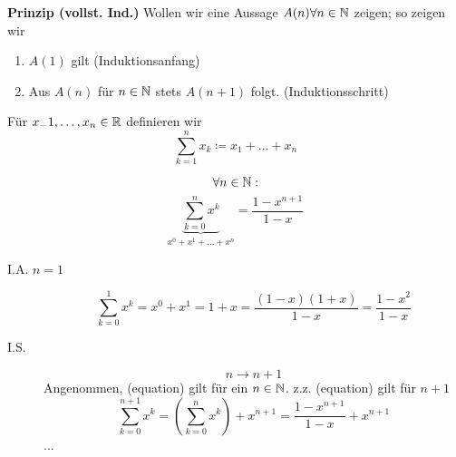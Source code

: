 \documentclass[consecutivenumbering]{gadsescript}
\begin{document}
\textbf{Prinzip (vollst. Ind.)} Wollen wir eine Aussage $ A(n) \forall n \in \mathbb{N} $ zeigen; so zeigen wir
\begin{enumerate}[label=(\roman*)]
	\item $ A(1) $ gilt (Induktionsanfang)
	\item Aus $ A(n) $ für $ n \in \mathbb{N} $ stets $ A(n+1) $ folgt. (Induktionsschritt)
\end{enumerate}

\begin{definition}[Summen]
	Für $x_-1, \dotsc, x_n \in \mathbb{R} $ definieren wir
	\[ \sum_{k = 1}^{n} x_k \coloneqq x_1 + \dotsc + x_n \]
\end{definition}

\begin{example}
	\[ \forall n \in \mathbb{N} : \]
	\begin{equation}
		\underbrace{\sum_{k=0}^{n} x^k}_{x^0 + x^1 + ... + x^n} =  \frac{1-x^{n+1}}{1-x}
	\end{equation}
	
	\begin{description}
		\item[I.A. $n = 1$]
			\[ \sum_{k=0}^{1}x^k = x^0 + x^1 = 1+x = \frac{(1-x)(1+x)}{1-x} = \frac{1-x^2}{1-x} \]
		\item[I.S.]
			\[ n \to n+1 \] Angenommen, (equation) gilt für ein $n \in \mathbb{N} $.
			z.z. (equation) gilt für $ n + 1 $
			\[ \sum_{k=0}^{n+1}x^k = \left( \sum_{k=0}^{n}x^k\right) + x^{n+1} =  \frac{1 - x^{n + 1}}{1 - x} + x^{n + 1}\]
			...
	\end{description}
\end{example}
\end{document}
